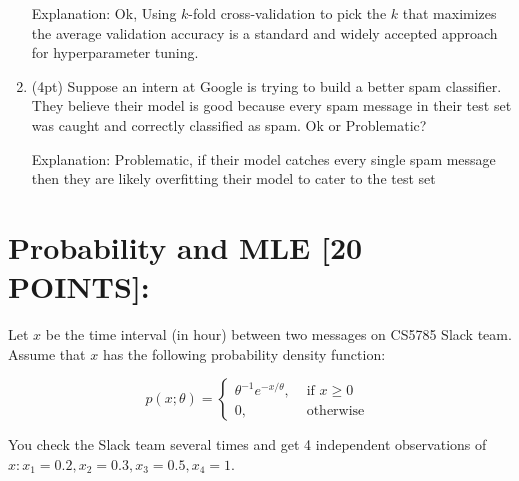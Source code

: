 \documentclass[10pt, a4paper]{article}
\begin{document}
\begin{enumerate}[label=(\alph*)]
    \item[Explanation:] Ok, Using \(k\)-fold cross-validation to pick the \(k\) that maximizes the average validation accuracy is a standard and widely accepted approach for hyperparameter tuning.

    \item (4pt) Suppose an intern at Google is trying to build a better spam classifier. They believe their model is good because every spam message in their test set was caught and correctly classified as spam. Ok or Problematic?

    \item[Explanation:] Problematic, if their model catches every single spam message then they are likely overfitting their model to cater to the test set
\end{enumerate}

\section{Probability and MLE [20 POINTS]:}
Let $x$ be the time interval (in hour) between two messages on CS5785 Slack team. Assume that $x$ has the following probability density function:

$$
p(x ; \theta)= \begin{cases}\theta^{-1} e^{-x / \theta}, & \text { if } x \geq 0 \\ 0, & \text { otherwise }\end{cases}
$$

You check the Slack team several times and get 4 independent observations of $x: x_{1}=0.2, x_{2}=0.3, x_{3}=0.5, x_{4}=1$.
\end{document}
